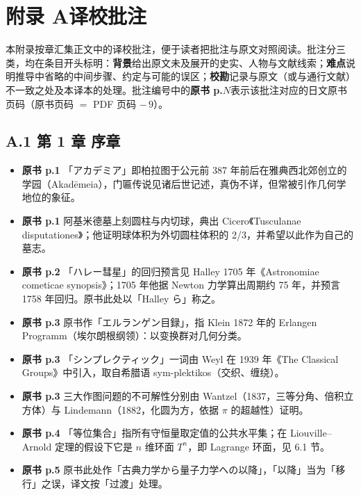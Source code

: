 \chapter*{附录 A\quad 译校批注}

本附录按章汇集正文中的译校批注，便于读者把批注与原文对照阅读。批注分三类，均在条目开头标明：\textbf{背景}给出原文未及展开的史实、人物与文献线索；\textbf{难点}说明推导中省略的中间步骤、约定与可能的误区；\textbf{校勘}记录与原文（或与通行文献）不一致之处及本译本的处理。批注编号中的\textbf{原书 p.$N$}表示该批注对应的日文原书页码（原书页码 $=$ PDF 页码 $-\,9$）。\par\medskip

\section*{A.1 第 1 章 序章}
\begin{itemize}[leftmargin=2.4em,itemsep=4pt,label={\textbullet}]
\item \textbf{原书 p.1} 「アカデミア」即柏拉图于公元前 387 年前后在雅典西北郊创立的学园（Akadēmeia），门匾传说见诸后世记述，真伪不详，但常被引作几何学地位的象征。
\item \textbf{原书 p.1} 阿基米德墓上刻圆柱与内切球，典出 Cicero《Tusculanae disputationes》；他证明球体积为外切圆柱体积的 2/3，并希望以此作为自己的墓志。
\item \textbf{原书 p.2} 「ハレー彗星」的回归预言见 Halley 1705 年《Astronomiae cometicae synopsis》；1705 年他据 Newton 力学算出周期约 75 年，并预言 1758 年回归。原书此处以「Halley ら」称之。
\item \textbf{原书 p.3} 原书作「エルランゲン目録」，指 Klein 1872 年的 Erlangen Programm（埃尔朗根纲领）：以变换群对几何分类。
\item \textbf{原书 p.3} 「シンプレクティック」一词由 Weyl 在 1939 年《The Classical Groups》中引入，取自希腊语 sym-plektikos（交织、缠绕）。
\item \textbf{原书 p.3} 三大作图问题的不可解性分别由 Wantzel（1837，三等分角、倍积立方体）与 Lindemann（1882，化圆为方，依据 $\pi$ 的超越性）证明。
\item \textbf{原书 p.4} 「等位集合」指所有守恒量取定值的公共水平集；在 Liouville–Arnold 定理的假设下它是 $n$ 维环面 $T^n$，即 Lagrange 环面，见 6.1 节。
\item \textbf{原书 p.5} 原书此处作「古典力学から量子力学への以降」，「以降」当为「移行」之误，译文按「过渡」处理。
\end{itemize}

